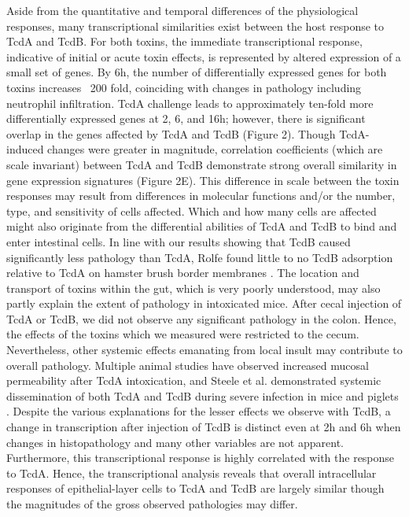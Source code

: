 Aside from the quantitative and temporal differences of the physiological responses, many transcriptional similarities exist between the host response to TcdA and TcdB. For both toxins, the immediate transcriptional response, indicative of initial or acute toxin effects, is represented by altered expression of a small set of genes. By 6h, the number of differentially expressed genes for both toxins increases ~200 fold, coinciding with changes in pathology including neutrophil infiltration. TcdA challenge leads to approximately ten-fold more differentially expressed genes at 2, 6, and 16h; however, there is significant overlap in the genes affected by TcdA and TcdB (Figure 2). Though TcdA-induced changes were greater in magnitude, correlation coefficients (which are scale invariant) between TcdA and TcdB demonstrate strong overall similarity in gene expression signatures (Figure 2E). This difference in scale between the toxin responses may result from differences in molecular functions and/or the number, type, and sensitivity of cells affected. Which and how many cells are affected might also originate from the differential abilities of TcdA and TcdB to bind and enter intestinal cells. In line with our results showing that TcdB caused significantly less pathology than TcdA, Rolfe found little to no TcdB adsorption relative to TcdA on hamster brush border membranes \cite{Rolfe:1991vx}. The location and transport of toxins within the gut, which is very poorly understood, may also partly explain the extent of pathology in intoxicated mice. After cecal injection of TcdA or TcdB, we did not observe any significant pathology in the colon. Hence, the effects of the toxins which we measured were restricted to the cecum. Nevertheless, other systemic effects emanating from local insult may contribute to overall pathology. Multiple animal studies have observed increased mucosal permeability after TcdA intoxication, and Steele et al. demonstrated systemic dissemination of both TcdA and TcdB during severe infection in mice and piglets \cite{Steele:2012ft}. Despite the various explanations for the lesser effects we observe with TcdB, a change in transcription after injection of TcdB is distinct even at 2h and 6h when changes in histopathology and many other variables are not apparent. Furthermore, this transcriptional response is highly correlated with the response to TcdA. Hence, the transcriptional analysis reveals that overall intracellular responses of epithelial-layer cells to TcdA and TcdB are largely similar though the magnitudes of the gross observed pathologies may differ.
 

